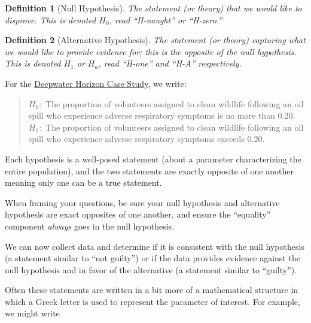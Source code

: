 \documentclass[
]{book}
\theoremstyle{plain}
\theoremstyle{mydefn}
\newtheorem{definition}{Definition}[chapter]
\theoremstyle{myexmpl}
\theoremstyle{remark}
\begin{document}
\begin{definition}[Null Hypothesis]
\protect\hypertarget{def:defn-null-hypothesis}{}{\label{def:defn-null-hypothesis} {} }The statement (or theory) that we would like to \emph{disprove}. This is denoted \(H_0\), read ``H-naught'' or ``H-zero.''
\end{definition}

\begin{definition}[Alternative Hypothesis]
\protect\hypertarget{def:defn-alternative-hypothesis}{}{\label{def:defn-alternative-hypothesis} {} }The statement (or theory) capturing what we would like to provide evidence \emph{for}; this is the opposite of the null hypothesis. This is denoted \(H_1\) or \(H_a\), read ``H-one'' and ``H-A'' respectively.
\end{definition}

For the \protect\hyperlink{CaseDeepwater}{Deepwater Horizon Case Study}, we write:

\begin{quote}
\(H_0:\) The proportion of volunteers assigned to clean wildlife following an oil spill who experience adverse respiratory symptoms is no more than 0.20.\\
\(H_1:\) The proportion of volunteers assigned to clean wildlife following an oil spill who experience adverse respiratory symptoms exceeds 0.20.
\end{quote}

Each hypothesis is a well-posed statement (about a parameter characterizing the entire population), and the two statements are exactly opposite of one another meaning only one can be a true statement.

\begin{rmdtip}
When framing your questions, be sure your null hypothesis and alternative hypothesis are exact opposites of one another, and ensure the ``equality'' component \emph{always} goes in the null hypothesis.
\end{rmdtip}

We can now collect data and determine if it is consistent with the null hypothesis (a statement similar to ``not guilty'') or if the data provides evidence against the null hypothesis and in favor of the alternative (a statement similar to ``guilty'').

Often these statements are written in a bit more of a mathematical structure in which a Greek letter is used to represent the parameter of interest. For example, we might write
\end{document}
